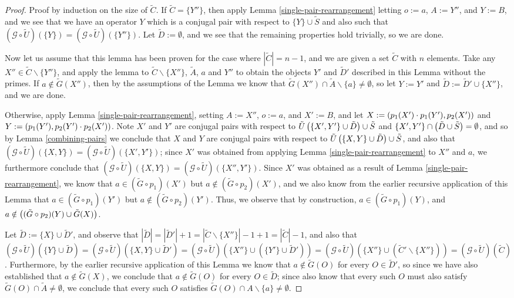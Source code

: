 \documentclass[twocolumn,showpacs,preprintnumbers,amsmath,amssymb,nofootinbib,pra,floatfix]{revtex4-1}
\newcommand{\set}{\tilde}
\newcommand{\genfun}{\mathcal{G}}
\begin{document}
\begin{proof}
Proof by induction on the size of $\set C$.  If $\set C=\{Y''\}$, then apply Lemma \ref{single-pair-rearrangement} letting $o:=a$, $A:=Y''$, and $Y:=B$, and we see that we have an operator $Y$ which is a conjugal pair with respect to $\{Y\}\cup\set S$ and also such that $(\genfun\circ\set U)(\{Y\})=(\genfun\circ\set U)(\{Y''\})$.  Let $\set D:=\emptyset$, and we see that the remaining properties hold trivially, so we are done.

Now let us assume that this lemma has been proven for the case where $|\set C|=n-1$, and we are given a set $\set C$ with $n$ elements.  Take any $X''\in\set C\backslash\{Y''\}$, and apply the lemma to $\set C\backslash \{X''\}$, $\set A$, $a$ and $Y''$ to obtain the objects $Y'$ and $\set D'$ described in this Lemma without the primes.  If $a\notin\set G(X'')$, then by the assumptions of the Lemma we know that $\set G(X'') \cap \set A\backslash \{a\} \ne \emptyset$, so let $Y:=Y'$ and $\set D:=\set D'\cup\{X''\}$, and we are done.

Otherwise, apply Lemma \ref{single-pair-rearrangement}, setting $A:=X''$, $o:=a$, and $X':=B$, and let $X:=\left(p_1(X')\cdot p_1(Y'),p_2(X')\right)$ and $Y:=\left(p_1(Y'),p_2(Y')\cdot p_2(X')\right)$.  Note $X'$ and $Y'$ are conjugal pairs with respect to $\set U\paren{\{X',Y'\}\cup\set D}\cup\set S$ and $\{X',Y'\}\cap \paren{\set D\cup\set S}=\emptyset$, and so by Lemma \ref{combining-pairs} we conclude that $X$ and $Y$ are conjugal pairs with respect to $\set U\paren{\{X,Y\}\cup\set D}\cup\set S$, and also that $(\genfun\circ\set U)(\{X,Y\})=(\genfun\circ\set U)(\{X',Y'\})$;  since $X'$ was obtained from applying Lemma \ref{single-pair-rearrangement} to $X''$ and $a$, we furthermore conclude that $(\genfun\circ\set U)(\{X,Y\})=(\genfun\circ\set U)(\{X'',Y'\})$.  Since $X'$ was obtained as a result of Lemma \ref{single-pair-rearrangement}, we know that $a\in (\set G \circ p_1)(X')$ but $a\notin (\set G \circ p_2)(X')$, and we also know from the earlier recursive application of this Lemma that $a\in (\set G \circ p_1)(Y')$ but $a\notin (\set G \circ p_2)(Y')$.  Thus, we observe that by construction, $a\in (\set G \circ p_1)(Y)$, and $a\notin \paren{(\set G \circ p_2)(Y) \cup \set G(X)}$.

Let $\set D:=\{X\}\cup\set D'$, and observe that $|\set D|=|\set D'|+1=|\set C\backslash \{X''\}|-1+1=|\set C|-1$, and also that $(\genfun\circ\set U)(\{Y\}\cup\set D)=(\genfun\circ\set U)(\{X,Y\}\cup\set D')=(\genfun\circ\set U)(\{X''\}\cup(\{Y'\}\cup\set D'))=(\genfun\circ\set U)(\{X''\}\cup(\set C'\backslash\{X''\}))=(\genfun\circ\set U)(\set C)$.  Furthermore, by the earlier recursive application of this Lemma we know that $a\notin\set G(O)$ for every $O\in \set D'$, so since we have also established that $a\notin \set G(X)$, we conclude that $a\notin\set G(O)$ for every $O\in \set D$;  since also know that every such $O$ must also satisfy $\set G(O)\cap \set A \ne \emptyset$, we conclude that every such $O$ satisfies $\set G(O) \cap A\backslash\{a\}\ne\emptyset$.
\end{proof}
\end{document}
